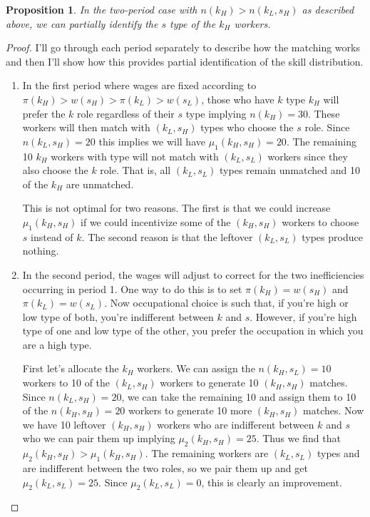 \documentclass[12 pt]{article}
\newtheorem{proposition}{Proposition} %
\begin{document}
\begin{proposition}
	In the two-period case with $n(k_H) > n(k_L,s_H)$ as described above, we can partially identify the $s$ type of the $k_H$ workers.
\end{proposition}
\begin{proof}
	I'll go through each period separately to describe how the matching works and then I'll show how this provides partial identification of the skill distribution. 
	\begin{enumerate}
		\item In the first period where wages are fixed according to $\pi(k_H) > w(s_H) > \pi(k_L) > w(s_L)$, those who have $k$ type $k_H$ will prefer the $k$ role regardless of their $s$ type implying $n(k_H)=30$. These workers will then match with $(k_L,s_H)$ types who choose the $s$ role. Since $n(k_L,s_H)=20$ this implies we will have $\mu_1(k_H,s_H) = 20$. The remaining 10 $k_H$ workers with type will not match with $(k_L,s_L)$ workers since they also choose the $k$ role. That is, all $(k_L,s_L)$  types remain unmatched and 10 of the $k_H$ are unmatched. 
		
		This is not optimal for two reasons. The first is that we could increase $\mu_1(k_H,s_H)$ if we could incentivize some of the $(k_H,s_H)$ workers to choose $s$ instead of $k$. The second reason is that the leftover  $(k_L,s_L)$ types produce nothing.
		
		\item In the second period, the wages will adjust to correct for the two inefficiencies occurring in period 1. One way to do this is to set $\pi(k_H)=w(s_H)$ and $\pi(k_L)=w(s_L)$. Now occupational choice is such that, if you're high or low type of both, you're indifferent between $k$ and $s$. However, if you're high type of one and low type of the other, you prefer the occupation in which you are a high type.
		
		 First let's allocate the $k_H$ workers. We can assign the $n(k_H,s_L)=10$ workers to 10 of the $(k_L,s_H)$ workers to generate 10 $(k_H,s_H)$ matches. Since $n(k_L,s_H)=20$, we can take the remaining 10 and assign them to 10 of the $n(k_H,s_H)=20$ workers to generate 10 more $(k_H,s_H)$ matches. Now we have 10 leftover $(k_H,s_H)$ workers who are indifferent between $k$ and $s$ who we can pair them up implying $\mu_2(k_H,s_H) = 25$. Thus we find that  $\mu_2(k_H,s_H) > \mu_1(k_H,s_H)$. The remaining workers are $(k_L,s_L)$ types and are indifferent between the two roles, so we pair them up and get $\mu_2(k_L,s_L)=25$.  Since $\mu_2(k_L,s_L)=0$, this is clearly an improvement.
		 

\end{enumerate}
\end{proof}
\end{document}
